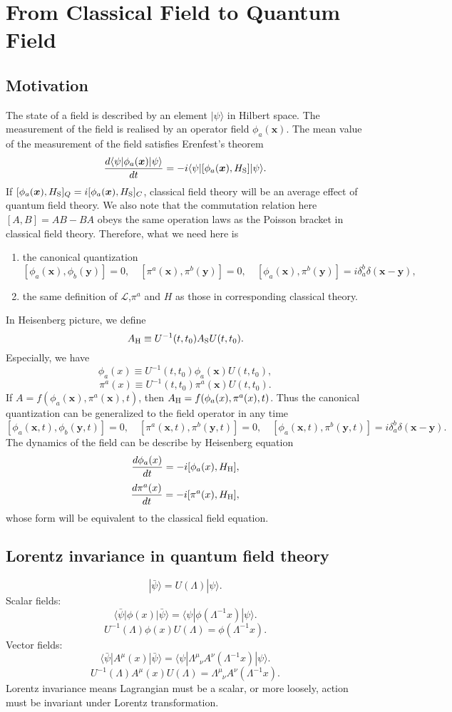 \chapter{From Classical Field to Quantum Field}
\section{Motivation}
The state of a field is described by an element $|\psi\rangle$ in Hilbert space. The measurement of the field is realised by an operator field $\phi_a(\bm{x})$. The mean value of the measurement of the field satisfies Erenfest's theorem
\[\frac{d\langle \psi| \phi_a(\bm{x}) | \psi \rangle}{dt} = -i \langle \psi | [\phi_a(\bm{x}),H_{\rm S}] | \psi \rangle.\]
If $[\phi_a(\bm{x}),H_{\rm S}]_Q = i[\phi_a(\bm{x}),H_{\rm S}]_C$, classical field theory will be an average effect of quantum field theory. We also note that the commutation relation here $[A,B] = AB - BA$ obeys the same operation laws as the Poisson bracket in classical field theory. Therefore, what we need here is
\begin{enumerate}
\item the canonical quantization
\[[\phi_a(\bm{x}),\phi_b(\bm{y})] = 0 , \quad [\pi^a(\bm{x}),\pi^b(\bm{y})] = 0 , \quad [\phi_a(\bm{x}),\pi^b(\bm{y})] = i \delta_a^b \delta(\bm{x}-\bm{y}) ,\]
\item the same definition of $\mathcal{L}$,$\pi^a$ and $H$ as those in corresponding classical theory.
\end{enumerate}
In Heisenberg picture, we define
\[A_{\rm H} \equiv U^{-1}(t,t_0) A_{\rm S} U(t,t_0).\]
Especially, we have
\[\phi_a(x) \equiv U^{-1}(t,t_0) \phi_a(\bm{x}) U(t,t_0),\]
\[\pi^a(x) \equiv U^{-1}(t,t_0) \pi^a(\bm{x}) U(t,t_0).\]
If $A = f(\phi_a(\bm{x}),\pi^a(\bm{x}),t)$, then $A_{\rm H} = f(\phi_a(x),\pi^a(x),t)$.
Thus the canonical quantization can be generalized to the field operator in any time
\[[\phi_a(\bm{x},t),\phi_b(\bm{y},t)] = 0 , \quad [\pi^a(\bm{x},t),\pi^b(\bm{y},t)] = 0 , \quad [\phi_a(\bm{x},t),\pi^b(\bm{y},t)] = i \delta_a^b \delta(\bm{x}-\bm{y}) .\]
The dynamics of the field can be describe by Heisenberg equation
\[\frac{d\phi_a(x)}{dt} = -i[\phi_a(x),H_{\rm H}],\]
\[\frac{d\pi^a(x)}{dt} = -i[\pi^a(x),H_{\rm H}],\]
whose form will be equivalent to the classical field equation.

\section{Lorentz invariance in quantum field theory}
\[| \bar{\psi}\rangle = U(\Lambda)| \psi\rangle.\]
Scalar fields:
\[\langle \bar{\psi} | \phi(x) | \bar{\psi}\rangle = \langle \psi | \phi(\Lambda^{-1}x) | \psi\rangle.\]
\[U^{-1}(\Lambda) \phi(x) U(\Lambda) = \phi(\Lambda^{-1}x).\]
Vector fields:
\[\langle \bar{\psi} | A^{\mu}(x) | \bar{\psi}\rangle = \langle \psi | \Lambda^{\mu}_{\phantom{\mu}\nu} A^{\nu}(\Lambda^{-1}x) | \psi\rangle.\]
\[U^{-1}(\Lambda) A^{\mu}(x) U(\Lambda) = \Lambda^{\mu}_{\phantom{\mu}\nu} A^{\nu}(\Lambda^{-1}x).\]
Lorentz invariance means Lagrangian must be a scalar, or more loosely, action must be invariant under Lorentz transformation.

